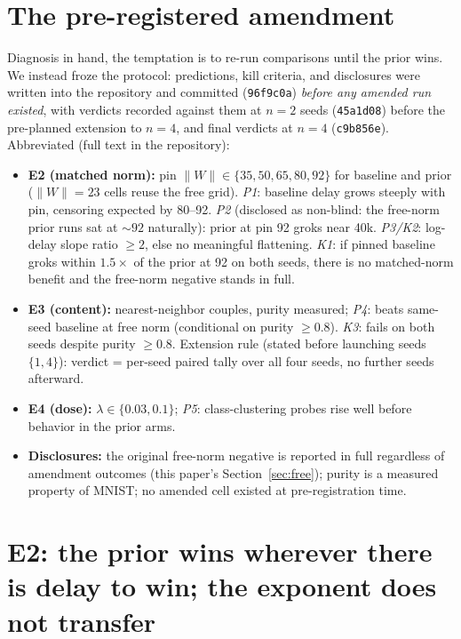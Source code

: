 \documentclass[11pt]{article}
\newcommand{\W}{\lVert W\rVert}
\begin{document}
\section{The pre-registered amendment}
\label{sec:prereg}

Diagnosis in hand, the temptation is to re-run comparisons until the prior wins. We instead
froze the protocol: predictions, kill criteria, and disclosures were written into the
repository and committed (\texttt{96f9c0a}) \emph{before any amended run existed}, with
verdicts recorded against them at $n{=}2$ seeds (\texttt{45a1d08}) before the pre-planned
extension to $n{=}4$, and final verdicts at $n{=}4$ (\texttt{c9b856e}). Abbreviated (full text
in the repository):

\begin{itemize}
\item \textbf{E2 (matched norm):} pin $\W \in \{35,50,65,80,92\}$ for baseline and prior
  ($\W{=}23$ cells reuse the free grid). \emph{P1}: baseline delay grows steeply with pin,
  censoring expected by 80--92. \emph{P2} (disclosed as non-blind: the free-norm prior runs sat
  at ${\sim}92$ naturally): prior at pin 92 groks near 40k. \emph{P3/K2}: log-delay slope ratio
  $\geq 2$, else no meaningful flattening. \emph{K1}: if pinned baseline groks within $1.5\times$
  of the prior at 92 on both seeds, there is no matched-norm benefit and the free-norm negative
  stands in full.
\item \textbf{E3 (content):} nearest-neighbor couples, purity measured; \emph{P4}: beats
  same-seed baseline at free norm (conditional on purity $\geq 0.8$). \emph{K3}: fails on both
  seeds despite purity $\geq 0.8$. Extension rule (stated before launching seeds $\{1,4\}$):
  verdict = per-seed paired tally over all four seeds, no further seeds afterward.
\item \textbf{E4 (dose):} $\lambda \in \{0.03, 0.1\}$; \emph{P5}: class-clustering probes rise
  well before behavior in the prior arms.
\item \textbf{Disclosures:} the original free-norm negative is reported in full regardless of
  amendment outcomes (this paper's Section~\ref{sec:free}); purity is a measured property of
  MNIST; no amended cell existed at pre-registration time.
\end{itemize}

\section{E2: the prior wins wherever there is delay to win; the exponent does not transfer}
\label{sec:e2}
\end{document}
